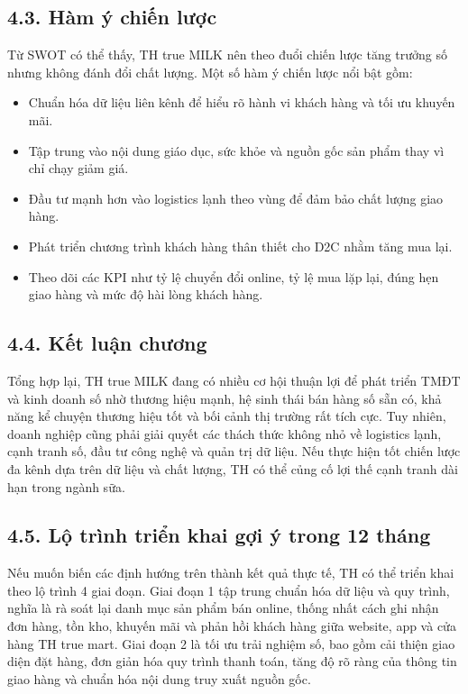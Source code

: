 \subsection*{4.3. Hàm ý chiến lược}
Từ SWOT có thể thấy, TH true MILK nên theo đuổi chiến lược tăng trưởng số nhưng không đánh đổi chất lượng. Một số hàm ý chiến lược nổi bật gồm:

\begin{itemize}
    \item Chuẩn hóa dữ liệu liên kênh để hiểu rõ hành vi khách hàng và tối ưu khuyến mãi.
    \item Tập trung vào nội dung giáo dục, sức khỏe và nguồn gốc sản phẩm thay vì chỉ chạy giảm giá.
    \item Đầu tư mạnh hơn vào logistics lạnh theo vùng để đảm bảo chất lượng giao hàng.
    \item Phát triển chương trình khách hàng thân thiết cho D2C nhằm tăng mua lại.
    \item Theo dõi các KPI như tỷ lệ chuyển đổi online, tỷ lệ mua lặp lại, đúng hẹn giao hàng và mức độ hài lòng khách hàng.
\end{itemize}

\subsection*{4.4. Kết luận chương}
Tổng hợp lại, TH true MILK đang có nhiều cơ hội thuận lợi để phát triển TMĐT và kinh doanh số nhờ thương hiệu mạnh, hệ sinh thái bán hàng số sẵn có, khả năng kể chuyện thương hiệu tốt và bối cảnh thị trường rất tích cực. Tuy nhiên, doanh nghiệp cũng phải giải quyết các thách thức không nhỏ về logistics lạnh, cạnh tranh số, đầu tư công nghệ và quản trị dữ liệu. Nếu thực hiện tốt chiến lược đa kênh dựa trên dữ liệu và chất lượng, TH có thể củng cố lợi thế cạnh tranh dài hạn trong ngành sữa.

\subsection*{4.5. Lộ trình triển khai gợi ý trong 12 tháng}
Nếu muốn biến các định hướng trên thành kết quả thực tế, TH có thể triển khai theo lộ trình 4 giai đoạn. Giai đoạn 1 tập trung chuẩn hóa dữ liệu và quy trình, nghĩa là rà soát lại danh mục sản phẩm bán online, thống nhất cách ghi nhận đơn hàng, tồn kho, khuyến mãi và phản hồi khách hàng giữa website, app và cửa hàng TH true mart. Giai đoạn 2 là tối ưu trải nghiệm số, bao gồm cải thiện giao diện đặt hàng, đơn giản hóa quy trình thanh toán, tăng độ rõ ràng của thông tin giao hàng và chuẩn hóa nội dung truy xuất nguồn gốc.


